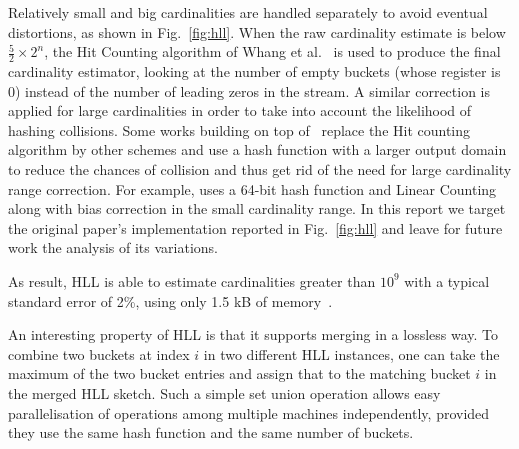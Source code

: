 \documentclass[11pt]{article}
\begin{document}
Relatively small and big cardinalities are handled separately to avoid eventual distortions, as shown in Fig.~\ref{fig:hll}. When the raw cardinality estimate is below $\frac{5}{2}\times 2^n$, the Hit Counting algorithm of Whang et al.~\cite{hitcounting} is used to produce the final cardinality estimator, looking at the number of empty buckets (whose register is 0) instead of the number of leading zeros in the stream. A similar correction is applied for large cardinalities in order to take into account the likelihood of hashing collisions. Some works building on top of~\cite{hll} replace the Hit counting algorithm by other schemes and use a hash function with a larger output domain to reduce the chances of collision and thus get rid of the need for large cardinality range correction. For example, \cite{hllpratice} uses a 64-bit hash function and Linear Counting along with bias correction in the small cardinality range. In this report we target the original paper's implementation reported in Fig.~\ref{fig:hll} and leave for future work the analysis of its variations. 

As result, HLL is able to estimate cardinalities greater than $10^9$ with a typical standard error of 2\%, using only 1.5 kB of memory~\cite{hll}.

An interesting property of HLL is that it supports merging in a lossless way. To combine two buckets at index $i$ in two different HLL instances, one can take the maximum of the two bucket entries and assign that to the matching bucket $i$ in the merged HLL sketch. Such a simple set union operation allows easy parallelisation of operations among multiple machines independently, provided they use the same hash function and the same number of buckets.
\end{document}
